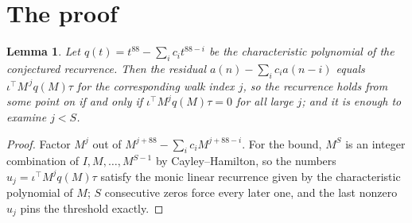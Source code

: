 \documentclass[11pt,a4paper]{article}
\theoremstyle{plain}
\newtheorem{lemma}[theorem]{Lemma}
\theoremstyle{definition}
\begin{document}
\section{The proof}

\begin{lemma}\label{lem:crit}
Let $q(t)=t^{88}-\sum_i c_it^{88-i}$ be the characteristic polynomial of the
conjectured recurrence. Then the residual $a(n)-\sum_ic_ia(n-i)$ equals
$\iota^{\!\top}M^{\,j}q(M)\tau$ for the corresponding walk index $j$, so the
recurrence holds from some point on if and only if $\iota^{\!\top}M^{j}q(M)\tau=0$ for all
large $j$; and it is enough to examine $j<S$.
\end{lemma}

\begin{proof}
Factor $M^{j}$ out of $M^{j+88}-\sum_ic_iM^{j+88-i}$. For the bound, $M^{S}$
is an integer combination of $I,M,\dots,M^{S-1}$ by Cayley--Hamilton, so the numbers
$u_j=\iota^{\!\top}M^{j}q(M)\tau$ satisfy the monic linear recurrence given by the
characteristic polynomial of $M$; $S$ consecutive zeros force every later one, and the last
nonzero $u_j$ pins the threshold exactly.
\end{proof}
\end{document}
